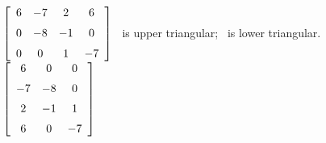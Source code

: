 {$\left[ \begin {array}{cccc} 6&-7&2&6\\\noalign{\medskip}0&-8&-1&0
\\\noalign{\medskip}0&0&1&-7\end {array} \right]$} 
{\tta\ is upper triangular; \ttat\ is lower triangular.$\left[ \begin {array}{ccc} 6&0&0\\\noalign{\medskip}-7&-8&0
\\\noalign{\medskip}2&-1&1\\\noalign{\medskip}6&0&-7\end {array}
 \right] $}


  

